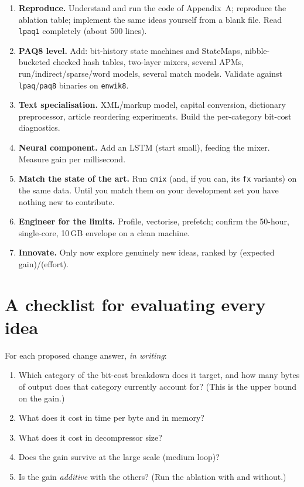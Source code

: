 \documentclass[11pt,a4paper,openany]{book}
\newcommand{\code}[1]{\texttt{#1}}
\theoremstyle{definition}
\theoremstyle{remark}
\begin{document}
\begin{enumerate}[label=\textbf{Stage \arabic*.},leftmargin=*]
\item \textbf{Reproduce.} Understand and run the code of Appendix~A; reproduce the ablation table; implement the same ideas yourself from a blank file. Read \code{lpaq1} completely (about 500 lines).
\item \textbf{PAQ8 level.} Add: bit-history state machines and StateMaps, nibble-bucketed checked hash tables, two-layer mixers, several APMs, run/indirect/sparse/word models, several match models. Validate against \code{lpaq}/\code{paq8} binaries on \code{enwik8}.
\item \textbf{Text specialisation.} XML/markup model, capital conversion, dictionary preprocessor, article reordering experiments. Build the per-category bit-cost diagnostics.
\item \textbf{Neural component.} Add an LSTM (start small), feeding the mixer. Measure gain per millisecond.
\item \textbf{Match the state of the art.} Run \code{cmix} (and, if you can, its \code{fx} variants) on the same data. Until you match them on your development set you have nothing new to contribute.
\item \textbf{Engineer for the limits.} Profile, vectorise, prefetch; confirm the 50-hour, single-core, 10\,GB envelope on a clean machine.
\item \textbf{Innovate.} Only now explore genuinely new ideas, ranked by (expected gain)/(effort).
\end{enumerate}

\section{A checklist for evaluating every idea}

For each proposed change answer, \emph{in writing}:
\begin{enumerate}
\item Which category of the bit-cost breakdown does it target, and how many bytes of output does that category currently account for? (This is the upper bound on the gain.)
\item What does it cost in time per byte and in memory?
\item What does it cost in decompressor size?
\item Does the gain survive at the large scale (medium loop)?
\item Is the gain \emph{additive} with the others? (Run the ablation with and without.)
\end{enumerate}
\end{document}
